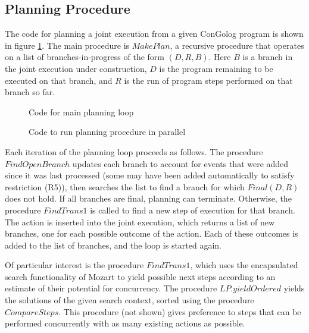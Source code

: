 \subsection{Planning Procedure}

The code for planning a joint execution from a given ConGolog program
is shown in figure \ref{fig:planning-code}. The main procedure is
$MakePlan$, a recursive procedure that operates on a list of branches-in-progress
of the form $(D,R,B)$. Here $B$ is a branch in the joint execution
under construction, $D$ is the program remaining to be executed on
that branch, and $R$ is the run of program steps performed on that
branch so far.

%
\begin{figure}

\caption{ Code for main planning loop }


\label{fig:planning-code} 
\end{figure}


%
\begin{figure}

\caption{ Code to run planning procedure in parallel }


\label{fig:parallel-search} 
\end{figure}


Each iteration of the planning loop proceeds as follows. The procedure
$FindOpenBranch$ updates each branch to account for events that were
added since it was last processed (some may have been added automatically
to satisfy restriction (R5)), then searches the list to find a branch
for which $Final(D,R)$ does not hold. If all branches are final,
planning can terminate. Otherwise, the procedure $FindTrans1$ is
called to find a new step of execution for that branch. The action
is inserted into the joint execution, which returns a list of new
branches, one for each possible outcome of the action. Each of these
outcomes is added to the list of branches, and the loop is started
again.

Of particular interest is the procedure $FindTrans1$, which uses
the encapsulated search functionality of Mozart to yield possible
next steps according to an estimate of their potential for concurrency.
The procedure $LP.yieldOrdered$ yields the solutions of the given
search context, sorted using the procedure $CompareSteps$. This procedure
(not shown) gives preference to steps that can be performed concurrently
with as many existing actions as possible.


